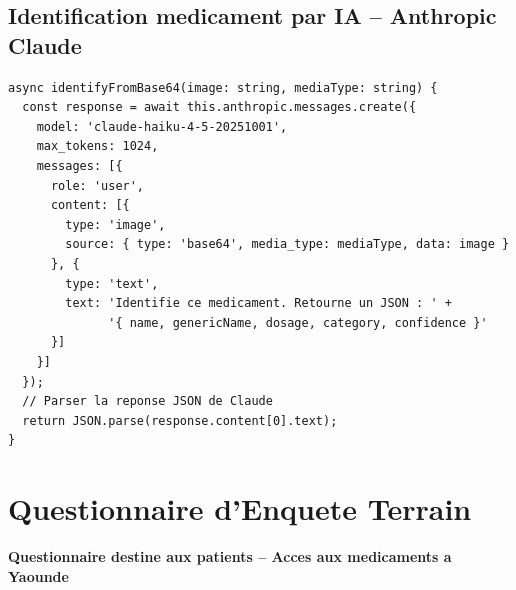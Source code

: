 \documentclass[12pt,a4paper]{report}
\begin{document}
\section{Identification medicament par IA -- Anthropic Claude}

\begin{lstlisting}[caption=MedicationIdentifyService -- Appel API Claude Haiku]
async identifyFromBase64(image: string, mediaType: string) {
  const response = await this.anthropic.messages.create({
    model: 'claude-haiku-4-5-20251001',
    max_tokens: 1024,
    messages: [{
      role: 'user',
      content: [{
        type: 'image',
        source: { type: 'base64', media_type: mediaType, data: image }
      }, {
        type: 'text',
        text: 'Identifie ce medicament. Retourne un JSON : ' +
              '{ name, genericName, dosage, category, confidence }'
      }]
    }]
  });
  // Parser la reponse JSON de Claude
  return JSON.parse(response.content[0].text);
}
\end{lstlisting}

\chapter{Questionnaire d'Enquete Terrain}

\textbf{Questionnaire destine aux patients -- Acces aux medicaments a Yaounde}
\end{document}
